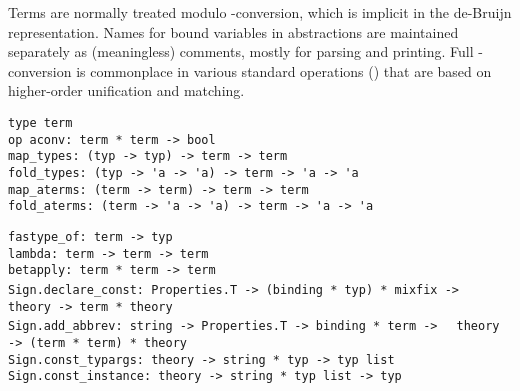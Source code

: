 \begin{isabellebody}
\begin{isamarkuptext}
  Terms are normally treated modulo \isa{{\isasymalpha}}-conversion, which is
  implicit in the de-Bruijn representation.  Names for bound variables
  in abstractions are maintained separately as (meaningless) comments,
  mostly for parsing and printing.  Full \isa{{\isasymalpha}{\isasymbeta}{\isasymeta}}-conversion is
  commonplace in various standard operations ()
  that are based on higher-order unification and matching.%
\end{isamarkuptext}%
\isamarkuptrue%
%
\isadelimmlref
%
\endisadelimmlref
%
\isatagmlref
%
\begin{isamarkuptext}%
\begin{mldecls}
  \verb|type term| \\
  \verb|op aconv: term * term -> bool| \\
  \verb|map_types: (typ -> typ) -> term -> term| \\
  \verb|fold_types: (typ -> 'a -> 'a) -> term -> 'a -> 'a| \\
  \verb|map_aterms: (term -> term) -> term -> term| \\
  \verb|fold_aterms: (term -> 'a -> 'a) -> term -> 'a -> 'a| \\
  \end{mldecls}
  \begin{mldecls}
  \verb|fastype_of: term -> typ| \\
  \verb|lambda: term -> term -> term| \\
  \verb|betapply: term * term -> term| \\
  \verb|Sign.declare_const: Properties.T -> (binding * typ) * mixfix ->|\isasep\isanewline%
\verb|  theory -> term * theory| \\
  \verb|Sign.add_abbrev: string -> Properties.T -> binding * term ->|\isasep\isanewline%
\verb|  theory -> (term * term) * theory| \\
  \verb|Sign.const_typargs: theory -> string * typ -> typ list| \\
  \verb|Sign.const_instance: theory -> string * typ list -> typ| \\
  \end{mldecls}

  \begin{description}


\end{description}
\end{isamarkuptext}
\end{isabellebody}
